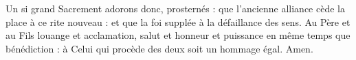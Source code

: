 Un si grand Sacrement 
adorons donc, prosternés : 
que l’ancienne alliance cède la place 
à ce rite nouveau : 
et que la foi supplée 
à la défaillance des sens.
\versseparator
Au Père et au Fils 
louange et acclamation, 
salut et honneur et puissance 
en même temps que bénédiction : 
à Celui qui procède des deux 
soit un hommage égal.
Amen.